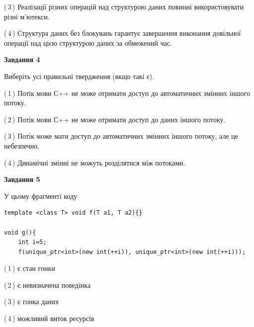 \documentclass[12pt, ukrainian]{article}
\begin{document}
\begin {large}
{(\,3\,) Реалізації різних операцій над структурою даних повинні використовувати різні м’ютекси.%

(\,4\,) Структура даних без блокувань гарантує завершення виконання довільної операції над цією структурою даних за обмежений час.%



\begin{center}
\textbf{Завдання 4}
\end{center}
Виберіть усі правильні твердження (якщо такі є).\par
\vspace{2mm}

(\,1\,) Потік мови С++ не може отримати доступ до автоматичних змінних іншого потоку.%

(\,2\,) Потік мови С++ не може отримати доступ до даних іншого потоку.%

(\,3\,) Потік може мати доступ до автоматичних змінних іншого потоку, але це небезпечно.%

(\,4\,) Динамічні змінні не можуть розділятися між потоками.%



\begin{center}
\textbf{Завдання 5}
\end{center}
У цьому фрагменті коду
\begin{verbatim}
template <class T> void f(T a1, T a2){}

void g(){
    int i=5;
    f(unique_ptr<int>(new int(++i)), unique_ptr<int>(new int(++i)));
\end{verbatim}

(\,1\,) є стан гонки%

(\,2\,) є невизначена поведінка%

(\,3\,) є гонка даних%

(\,4\,) можливий виток ресурсів%


}
\end {large}
\end{document}
